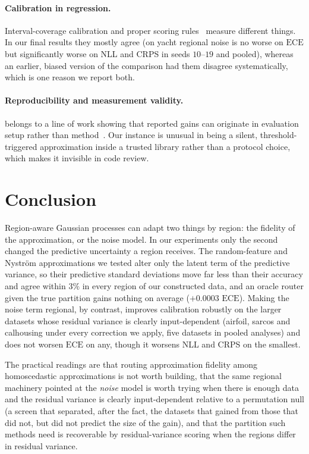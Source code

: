 \documentclass[11pt]{article}
\newcommand{\ece}{\mathrm{ECE}}
\begin{document}
\paragraph{Calibration in regression.} Interval-coverage calibration
\citep{kuleshov2018} and proper scoring rules~\citep{gneiting2007} measure different
things. In our final results they mostly agree (on yacht regional noise is no worse
on $\ece$ but significantly worse on NLL and CRPS in seeds $10$--$19$ and pooled), whereas an earlier, biased version of the comparison had them disagree
systematically, which is one reason we report both.

\paragraph{Reproducibility and measurement validity.}  belongs to a
line of work showing that reported gains can originate in evaluation setup rather than
method~\citep{henderson2018, musgrave2020, lipton2019}. Our instance is unusual in
being a silent, threshold-triggered approximation inside a trusted library rather than
a protocol choice, which makes it invisible in code review.

\section{Conclusion}

Region-aware Gaussian processes can adapt two things by region: the fidelity of the
approximation, or the noise model. In our experiments only the second changed the
predictive uncertainty a region receives. The random-feature and Nystr\"om
approximations we tested alter only the latent term of the predictive variance, so
their predictive standard deviations move far less than their accuracy and agree
within $3\%$ in every region of our constructed data, and an oracle router given the
true partition gains nothing on average ($+0.0003$ $\ece$). Making the noise term
regional, by contrast, improves calibration robustly on the larger datasets whose
residual variance is clearly input-dependent (airfoil, sarcos and calhousing under
every correction we apply, five datasets in pooled analyses) and does not worsen
$\ece$ on any, though it worsens NLL and CRPS on the smallest.

The practical readings are that routing approximation fidelity among homoscedastic
approximations is not worth building, that the same regional machinery pointed at the
\emph{noise} model is worth trying when there is enough data and the residual
variance is clearly input-dependent relative to a permutation null (a screen that
separated, after the fact, the datasets that gained from those that did not, but did
not predict the size of the gain), and that the
partition such methods need is recoverable by residual-variance scoring when the
regions differ in residual variance.
\end{document}
